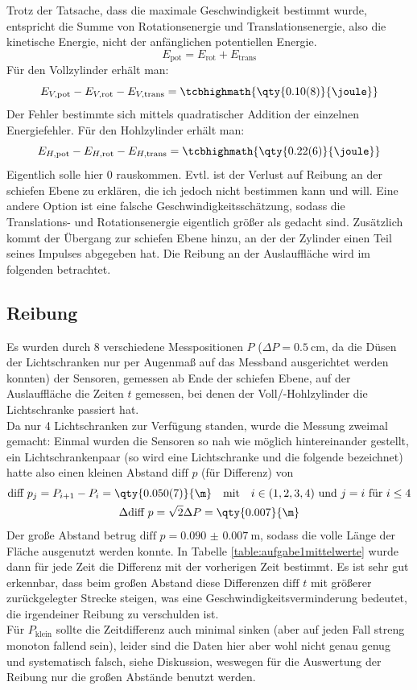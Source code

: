 Trotz der Tatsache, dass die maximale Geschwindigkeit bestimmt wurde, entspricht die Summe von Rotationsenergie und Translationsenergie, also die kinetische Energie, nicht der anfänglichen potentiellen Energie.
\begin{equation}
  E_{\text{pot}}=E_{\text{rot}}+E_{\text{trans}}
\end{equation}
Für den Vollzylinder erhält man: 
\[ E_{V,\text{pot}}-E_{V,\text{rot}}-E_{V,\text{trans}}= \tcbhighmath{\qty{0.10(8)}{\joule}}\]
Der Fehler bestimmte sich mittels quadratischer Addition der einzelnen Energiefehler.
Für den Hohlzylinder erhält man:
\[E_{H,\text{pot}}-E_{H,\text{rot}}-E_{H,\text{trans}}=\tcbhighmath{\qty{0.22(6)}{\joule}}\]
Eigentlich solle hier 0 rauskommen. Evtl. ist der Verlust auf Reibung an der schiefen Ebene zu erklären, die ich jedoch nicht bestimmen kann und will. Eine andere Option ist eine falsche Geschwindigkeitsschätzung, sodass die Translations- und Rotationsenergie eigentlich größer als gedacht sind.
Zusätzlich kommt der Übergang zur schiefen Ebene hinzu, an der der Zylinder einen Teil seines Impulses abgegeben hat.
Die Reibung an der Auslauffläche wird im folgenden betrachtet.
\newpage

\subsection{Reibung}
Es wurden durch 8 verschiedene Messpositionen \(P\) (\(\Delta P=\qty{0.5}{\cm}\), da die Düsen der Lichtschranken nur per Augenmaß auf das Messband ausgerichtet werden konnten) der Sensoren, gemessen ab Ende der schiefen Ebene, auf der Auslauffläche die Zeiten \(t\) gemessen, bei denen der Voll/-Hohlzylinder die Lichtschranke passiert hat.\\Da nur 4 Lichtschranken zur Verfügung standen, wurde die Messung zweimal gemacht: Einmal wurden die Sensoren so nah wie möglich hintereinander gestellt, ein Lichtschrankenpaar (so wird eine Lichtschranke und die folgende bezeichnet) hatte also einen kleinen Abstand \(\text{diff }p\) (für Differenz) von 
\begin{gather}
\text{diff }p_j=P_{i+1}-P_i=\qty{0.050(7)}{\m}\quad \text{mit\quad} i\in(1,2,3,4)\text{ und }j=i\text{ für }i\leq4\nonumber\\
\Delta \text{diff } p=\sqrt{2}\Delta P=\qty{0.007}{\m}\\
\end{gather} 
Der große Abstand betrug \(\text{diff }p=\qty{0.090(7)}{\m}\), sodass die volle Länge der Fläche ausgenutzt werden konnte. In Tabelle \cref{table:aufgabe1mittelwerte} wurde dann für jede Zeit die Differenz mit der vorherigen Zeit bestimmt. Es ist sehr gut erkennbar, dass beim großen Abstand diese Differenzen \(\text{diff }t\) mit größerer zurückgelegter Strecke steigen, was eine Geschwindigkeitsverminderung bedeutet, die irgendeiner Reibung zu verschulden ist.\\ Für \(P_{\text{klein}}\) sollte die Zeitdifferenz auch minimal sinken (aber auf jeden Fall streng monoton fallend sein), leider sind die Daten hier aber wohl nicht genau genug und systematisch falsch, siehe Diskussion, weswegen für die Auswertung der Reibung nur die großen Abstände benutzt werden.\par
